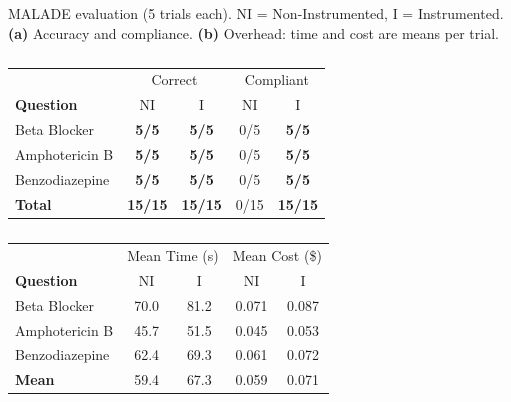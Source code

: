 \begin{table}[t]
\caption{MALADE evaluation (5 trials each). NI = Non-Instrumented, I = Instrumented. \textbf{(a)} Accuracy and compliance. \textbf{(b)} Overhead: time and cost are means per trial.}
\label{tab:malade}

\begin{subtable}[t]{0.49\textwidth}
\centering
\caption{}
\begin{tabular}{lcccc}
\toprule
 & \multicolumn{2}{c}{Correct} & \multicolumn{2}{c}{Compliant} \\
\cmidrule(lr){2-3} \cmidrule(lr){4-5}
\textbf{Question} & NI & I & NI & I \\
\midrule
Beta Blocker & \textbf{5/5} & \textbf{5/5} & 0/5 & \textbf{5/5} \\
Amphotericin B & \textbf{5/5} & \textbf{5/5} & 0/5 & \textbf{5/5} \\
Benzodiazepine & \textbf{5/5} & \textbf{5/5} & 0/5 & \textbf{5/5} \\
\midrule
\textbf{Total} & \textbf{15/15} & \textbf{15/15} & 0/15 & \textbf{15/15} \\
\bottomrule
\end{tabular}
\end{subtable}
\hfill
\begin{subtable}[t]{0.49\textwidth}
\centering
\caption{}
\begin{tabular}{lcccc}
\toprule
 & \multicolumn{2}{c}{Mean Time (s)} & \multicolumn{2}{c}{Mean Cost (\$)} \\
\cmidrule(lr){2-3} \cmidrule(lr){4-5}
\textbf{Question} & NI & I & NI & I \\
\midrule
Beta Blocker & 70.0 & 81.2 & 0.071 & 0.087 \\
Amphotericin B & 45.7 & 51.5 & 0.045 & 0.053 \\
Benzodiazepine & 62.4 & 69.3 & 0.061 & 0.072 \\
\midrule
\textbf{Mean} & 59.4 & 67.3 & 0.059 & 0.071 \\
\bottomrule
\end{tabular}
\end{subtable}
\end{table}
